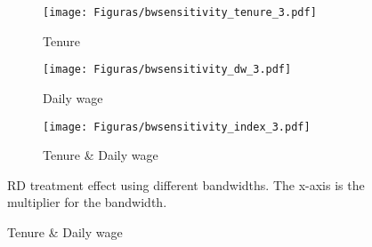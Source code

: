 \begin{figure}[H]
     \caption{Sensitivity to bandwidth choice (Calculator + letter treatment)}
    \label{bwsensitivity_t3}
\begin{center}
\begin{subfigure}{0.475\textwidth}
\caption{Tenure}
        \texttt{[image: Figuras/bwsensitivity\_tenure\_3.pdf]}
    \end{subfigure}
    \begin{subfigure}{0.475\textwidth}
\caption{Daily wage}
        \texttt{[image: Figuras/bwsensitivity\_dw\_3.pdf]}
    \end{subfigure}
    \begin{subfigure}{0.475\textwidth}
\caption{Tenure \& Daily wage}
        \texttt{[image: Figuras/bwsensitivity\_index\_3.pdf]}
    \end{subfigure}    
  \end{center}
  
    \scriptsize  RD treatment effect using different bandwidths. The x-axis is the multiplier for the bandwidth.
\end{figure}



\clearpage

%
%


